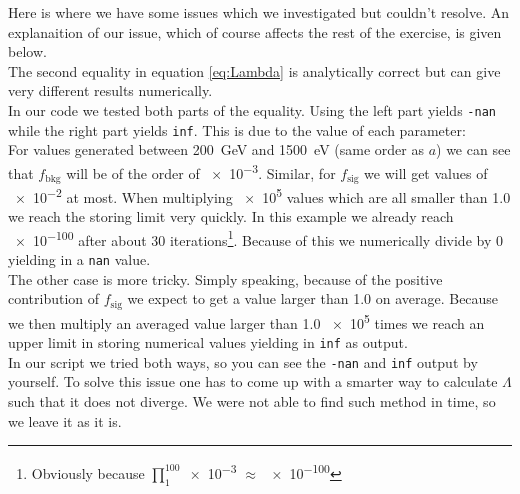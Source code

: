 \documentclass[10pt]{article}
\newenvironment{myfont}{\fontfamily{put}\selectfont}{\par}
\begin{document}
\begin{myfont}
\noindent Here is where we have some issues which we investigated but couldn't resolve.
An explanaition of our issue, which of course affects the rest of the exercise, is given below. \\

\noindent The second equality in equation \ref{eq:Lambda} is analytically correct but can give very different results numerically. \\
In our code we tested both parts of the equality.
Using the left part yields \texttt{-nan} while the right part yields \texttt{inf}.
This is due to the value of each parameter: \\
For values generated between \SI{200}{\giga\electronvolt} and \SI{1500}{\electronvolt} (same order as $a$) we can see that $f_{\textrm{bkg}}$ will be of the order of \num{e-3}.
Similar, for $f_\textrm{sig}$ we will get values of \num{e-2} at most.
When multiplying \num{e5} values which are all smaller than \num{1.0} we reach the storing limit very quickly.
In this example we already reach \num{e-100} after about \num{30} iterations\footnote{Obviously because $\prod_{1}^{100}$\num{e-3} $\approx$ \num{e-100}}.
Because of this we numerically divide by \num{0} yielding in a \texttt{nan} value. \\
The other case is more tricky.
Simply speaking, because of the positive contribution of $f_{\textrm{sig}}$ we expect to get a value larger than \num{1.0} on average.
Because we then multiply an averaged value larger than \num{1.0} \num{e5} times we reach an upper limit in storing numerical values yielding in \texttt{inf} as output. \\
In our script we tried both ways, so you can see the \texttt{-nan} and \texttt{inf} output by yourself.
To solve this issue one has to come up with a smarter way to calculate $\Lambda$ such that it does not diverge.
We were not able to find such method in time, so we leave it as it is.

\end{myfont}
\end{document}
